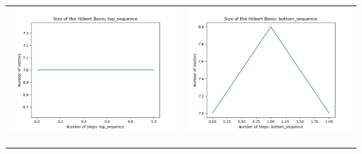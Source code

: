 \documentclass[10pt]{article}
\begin{document}
\begin{tabular}{c|c}
\begin{minipage}{.4\textwidth}
\includegraphics[width=\textwidth]{"DATA/5d/5 generators 2 bound H/top_sequence SIZE"}
\end{minipage} &
\begin{minipage}{.4\textwidth}
\includegraphics[width=\textwidth]{"DATA/5d/5 generators 2 bound H bottomup/bottom_sequence SIZE"}
\end{minipage} \\ \\
\hline \\\begin{minipage}{.4\textwidth}

\end{minipage}
\end{tabular}
\end{document}
